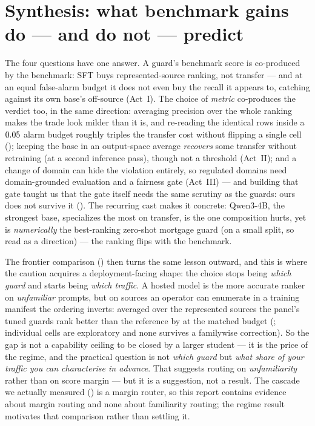 \documentclass[11pt]{article}
\begin{document}
\section{Synthesis: what benchmark gains do --- and do not --- predict}
\label{sec:synthesis}
The four questions have one answer. A guard's benchmark score is co-produced by the benchmark: SFT buys
represented-source ranking, not transfer --- and at an equal false-alarm budget it does not even buy the
recall it appears to, catching \MatchedTransferSft{} against its own base's \MatchedTransferBase{}
off-source (Act~I). The choice of \emph{metric} co-produces the verdict too, in the same direction:
averaging precision over the whole ranking makes the trade look milder than it is, and re-reading the
identical rows inside a $0.05$ alarm budget roughly triples the transfer cost without flipping
a single cell (); keeping the base in an output-space average
\emph{recovers} some transfer without retraining (at a second inference pass), though not a threshold (Act~II); and a change of
domain can hide the violation entirely, so regulated domains need domain-grounded evaluation and a
fairness gate (Act~III) --- and building that gate taught us that the gate itself needs the same
scrutiny as the guards: ours does not survive it ().
The recurring cast makes it concrete: Qwen3-4B, the strongest base, specializes the most on transfer,
is the one composition hurts, yet is \emph{numerically} the best-ranking zero-shot mortgage
guard (on a small split, so read as a direction) --- the ranking flips with the benchmark.

The frontier comparison () then turns the same lesson outward, and this is
where the caution acquires a deployment-facing shape: the choice stops being \emph{which guard}
and starts being \emph{which traffic}. A hosted model is the more accurate ranker on
\emph{unfamiliar} prompts, but on sources an operator can enumerate in a training manifest the ordering
inverts: averaged over the represented sources the panel's tuned guards rank better than the
reference by \HtwoAggDeltaTpr{} \HtwoAggDeltaTprCI{} at the matched budget (;
individual cells are exploratory and none survives a familywise correction). So the gap is not a capability ceiling to be closed by a larger student --- it is
the price of the regime, and the practical question is not \emph{which guard} but \emph{what share of
your traffic you can characterise in advance}. That suggests routing on \emph{unfamiliarity} rather than on
score margin --- but it is a suggestion, not a result. The cascade we actually measured
() is a margin router, so this report contains evidence about margin
routing and none about familiarity routing; the regime result motivates that comparison rather
than settling it.
\end{document}
